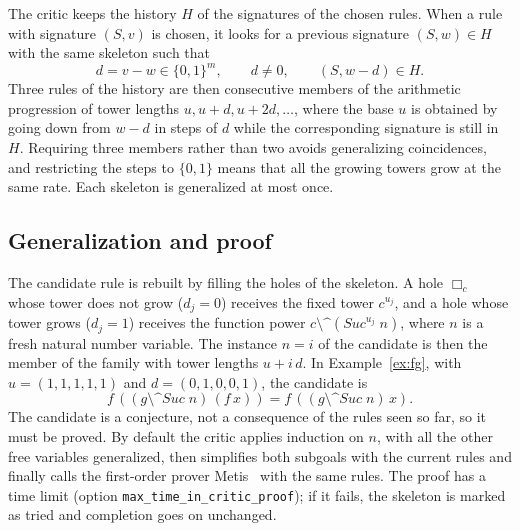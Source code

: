 \documentclass[preprint,12pt]{elsarticle}
\newcommand{\pw}[2]{#1^{#2}}               %
\newcommand{\pp}{\mathbin{\texttt{\^{}\^{}}}}     %
\newcommand{\fp}[2]{(#1 \pp #2)}                  %
\newcommand{\isa}[1]{\texttt{#1}}
\newcommand{\Suc}{\mathit{Suc}}
\begin{document}
The critic keeps the history $H$ of the signatures of the chosen rules.
When a rule with signature $(S, v)$ is chosen, it looks for a previous
signature $(S, w) \in H$ with the same skeleton such that
\[
  d = v - w \in \{0,1\}^m, \qquad d \ne 0, \qquad (S, w - d) \in H.
\]
Three rules of the history are then consecutive members of the arithmetic
progression of tower lengths $u, u + d, u + 2d, \ldots$, where the base $u$
is obtained by going down from $w - d$ in steps of $d$ while the
corresponding signature is still in $H$. Requiring three members rather
than two avoids generalizing coincidences, and restricting the steps to
$\{0,1\}$ means that all the growing towers grow at the same rate. Each
skeleton is generalized at most once.

\subsection{Generalization and proof}

The candidate rule is rebuilt by filling the holes of the skeleton. A hole
$\Box_c$ whose tower does not grow ($d_j = 0$) receives the fixed tower
$\pw{c}{u_j}$, and a hole whose tower grows ($d_j = 1$) receives the
function power $c \pp (\Suc^{u_j}\;n)$, where $n$ is a
fresh natural number variable. The instance $n = i$ of the candidate is
then the member of the family with tower lengths $u + i\,d$. In
Example~\ref{ex:fg}, with $u = (1,1,1,1,1)$ and $d = (0,1,0,0,1)$, the
candidate is
\[
  f\,(\fp{g}{\Suc\;n}\,(f\,x)) = f\,(\fp{g}{\Suc\;n}\,x).
\]
The candidate is a conjecture, not a consequence of the rules seen so far,
so it must be proved. By default the critic applies induction on $n$, with
all the other free variables generalized, then simplifies both subgoals
with the current rules and finally calls the first-order prover
Metis~\cite{PaulsonSusanto07} with the same rules. The proof has a time
limit (option \isa{max\_time\_in\_critic\_proof}); if it fails, the
skeleton is marked as tried and completion goes on unchanged.
\end{document}
